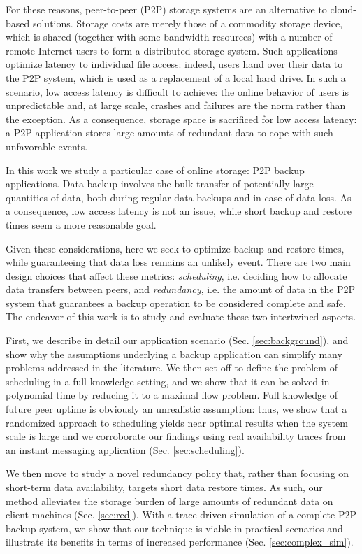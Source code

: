 \documentclass[conference,10pt]{IEEEtran}
\begin{document}
For these reasons, peer-to-peer (P2P) storage systems are an alternative to cloud-based solutions. Storage costs are merely those of a commodity storage device, which is shared (together with some bandwidth resources) with a number of remote Internet users to form a distributed storage system. Such applications optimize latency to individual file access: indeed, users hand over their data to the P2P system, which is used as a replacement of a local hard drive. In such a scenario, low access latency is difficult to achieve: the online behavior of users is unpredictable and, at large scale, crashes and failures are the norm rather than the exception. As a consequence, storage space is sacrificed for low access latency: a P2P application stores large amounts of redundant data to cope with such unfavorable events.

In this work we study a particular case of online storage: P2P backup
applications. Data backup involves the bulk transfer of potentially
large quantities of data, both during regular data backups and in case
of data loss. As a consequence, low access latency is not an issue,
while short backup and restore times seem a more reasonable goal.

Given these considerations, here we seek to optimize backup
and restore times, while guaranteeing that data loss remains an
unlikely event. There are two main design choices that affect these
metrics: \emph{scheduling}, i.e. deciding how to allocate data
transfers between peers, and \emph{redundancy}, i.e. the amount of
data in the P2P system that guarantees a backup operation to be
considered complete and safe. The endeavor of this work is to study
and evaluate these two intertwined aspects.

First, we describe in detail our application scenario (Sec.   \ref{sec:background}), and show why the assumptions underlying a backup application can simplify many problems addressed in the literature.
We then set off to define the problem of scheduling in a full knowledge setting, and we show that it can be solved in polynomial time by reducing it to a maximal flow problem. Full knowledge of future peer uptime is obviously an unrealistic assumption: thus, we show that a randomized approach to scheduling yields near optimal results when the system scale is large and we corroborate our findings using real availability traces from an instant messaging application (Sec. \ref{sec:scheduling}).

We then move to study a novel redundancy policy that, rather than focusing on short-term data availability, targets short data restore times. As such, our method alleviates the storage burden of large amounts of redundant data on client machines (Sec. \ref{sec:red}). With a trace-driven simulation of a complete P2P backup system, we show that our technique is viable in practical scenarios and illustrate its benefits in terms of increased performance (Sec. \ref{sec:complex_sim}).
\end{document}
